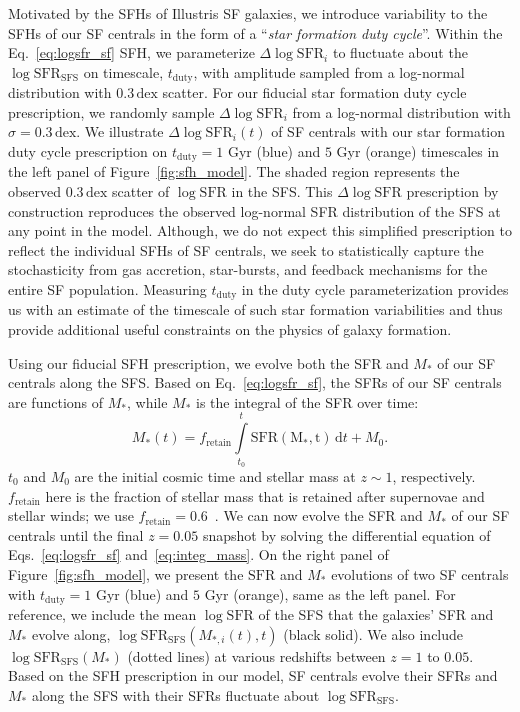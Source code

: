 \documentclass[12pt, letterpaper, preprint, tighten]{aastex62}
\newcommand{\beq}{\begin{equation}}
\newcommand{\eeq}{\end{equation}}
\newcommand{\logsfr}{\log\mathrm{SFR}}
\newcommand{\logsfrsfs}{\log\mathrm{SFR}_\mathrm{SFS}}
\begin{document}
Motivated by the SFHs of Illustris SF galaxies, we introduce variability 
to the SFHs of our SF centrals in the form of a ``\emph{star formation duty cycle}''. 
Within the Eq.~\ref{eq:logsfr_sf} SFH, we parameterize $\Delta \logsfr_i$ to 
fluctuate about the $\logsfrsfs$ on timescale, $t_\mathrm{duty}$, with 
amplitude sampled from a log-normal distribution with $0.3\,\mathrm{dex}$ 
scatter. For our fiducial star formation duty cycle prescription, we randomly 
sample $\Delta \logsfr_i$ from a log-normal distribution with $\sigma = 0.3\,\mathrm{dex}$. We 
illustrate $\Delta \logsfr_i(t)$ of SF centrals with our star formation 
duty cycle prescription on $t_\mathrm{duty}=1$ Gyr (blue) and $5$ Gyr (orange) 
timescales in the left panel of Figure~\ref{fig:sfh_model}. 
The shaded region represents the observed $0.3\,\mathrm{dex}$ scatter of 
$\logsfr$ in the SFS. This $\Delta \logsfr$ prescription by construction 
reproduces the observed log-normal SFR distribution of the SFS 
at any point in the model. Although, we do not expect this simplified 
prescription to reflect the individual SFHs of SF centrals, 
we seek to statistically capture the stochasticity from gas accretion, 
star-bursts, and feedback mechanisms for the entire SF population. 
Measuring $t_\mathrm{duty}$ in the duty cycle parameterization
provides us with an estimate of the timescale of such star formation 
variabilities and thus provide additional useful constraints on the 
physics of galaxy formation. 

Using our fiducial SFH prescription, we evolve both the SFR and $M_*$ 
of our SF centrals along the SFS. Based on Eq.~\ref{eq:logsfr_sf},
the SFRs of our SF centrals are functions of $M_*$, while $M_*$ 
is the integral of the SFR over time: 
\beq \label{eq:integ_mass} 
M_*(t) = f_\mathrm{retain} \int\limits_{t_0}^{t} \mathrm{SFR(M_*, t)}\,\mathrm{d}t + M_0. 
\eeq
$t_0$ and $M_0$ are the initial cosmic time and stellar mass at $z \sim 1$, 
respectively. $f_\mathrm{retain}$ here is the fraction of stellar mass 
that is retained after supernovae and stellar winds; we use 
$f_\mathrm{retain} = 0.6$~\citep{wetzel2013}. We can now evolve the SFR and 
$M_*$ of our SF centrals until the final $z=0.05$ snapshot by 
solving the differential equation of Eqs.~\ref{eq:logsfr_sf} and~\ref{eq:integ_mass}. 
On the right panel of Figure~\ref{fig:sfh_model}, we present the 
$\mathrm{SFR}$ and $M_*$ evolutions of two SF centrals with 
$t_\mathrm{duty}=1$ Gyr (blue) and $5$ Gyr (orange), same 
as the left panel. For reference, we include the mean $\logsfr$ of the SFS 
that the galaxies' SFR and $M_*$ evolve along, $\logsfrsfs(M_{*,i}(t), t)$ 
(black solid). We also include $\logsfrsfs(M_*)$ (dotted lines) at various 
redshifts between $z = 1$ to $0.05$. Based on the SFH prescription in our 
model, SF centrals evolve their SFRs and $M_*$ along the SFS 
with their SFRs fluctuate about $\logsfrsfs$.
\end{document}
